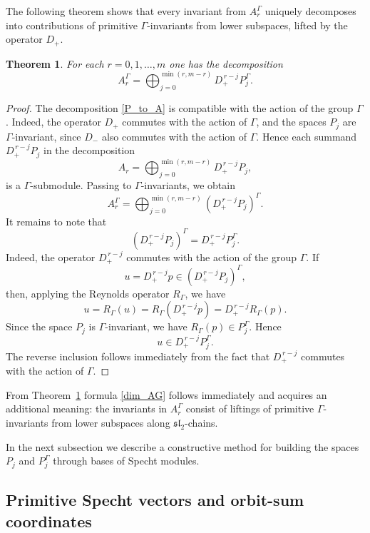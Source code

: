 \documentclass[12pt,reqno]{amsart}
\newtheorem{theorem}{Theorem}[section]
\begin{document}
The following theorem shows that every invariant from $A_r^\Gamma$ uniquely
decomposes into contributions of primitive $\Gamma$-invariants from lower
subspaces, lifted by the operator $D_+$.

\begin{theorem}\label{ AkGamma_primitive_decomposition}
For each $r=0,1,\dots,m$ one has the decomposition
$$
A_r^\Gamma
=
\bigoplus_{j=0}^{\min(r,m-r)}
D_+^{\,r-j}P_j^\Gamma.
$$
\end{theorem}

\begin{proof}
The decomposition \eqref{P_to_A} is compatible with the action of the group
$\Gamma$. Indeed, the operator $D_+$ commutes with the action of $\Gamma$,
and the spaces $P_j$ are $\Gamma$-invariant, since $D_-$ also commutes with
the action of $\Gamma$. Hence each summand $D_+^{\,r-j}P_j$ in the
decomposition
$$
A_r
=
\bigoplus_{j=0}^{\min(r,m-r)}
D_+^{\,r-j}P_j,
$$
is a $\Gamma$-submodule.
Passing to $\Gamma$-invariants, we obtain
$$
A_r^\Gamma
=
\bigoplus_{j=0}^{\min(r,m-r)}
\left(D_+^{\,r-j}P_j\right)^\Gamma.
$$
It remains to note that
$$
\left(D_+^{\,r-j}P_j\right)^\Gamma
=
D_+^{\,r-j}P_j^\Gamma.
$$
Indeed, the operator $D_+^{\,r-j}$ commutes with the action of the group
$\Gamma$.
If
$$
u=D_+^{\,r-j}p\in \left(D_+^{\,r-j}P_j\right)^\Gamma,
$$
then, applying the Reynolds operator $R_\Gamma$, we have
$$
u
=
R_\Gamma(u)
=
R_\Gamma(D_+^{\,r-j}p)
=
D_+^{\,r-j}R_\Gamma(p).
$$
Since the space $P_j$ is $\Gamma$-invariant, we have
$R_\Gamma(p)\in P_j^\Gamma$. Hence
$$
u\in D_+^{\,r-j}P_j^\Gamma.
$$
The reverse inclusion follows immediately from the fact that $D_+^{\,r-j}$
commutes with the action of $\Gamma$.
\end{proof}

From Theorem~\ref{ AkGamma_primitive_decomposition} formula
\eqref{dim_AG} follows immediately and acquires an additional meaning:
the invariants in $A_r^\Gamma$ consist of liftings of primitive
$\Gamma$-invariants from lower subspaces along $\mathfrak{sl}_2$-chains.

In the next subsection we describe a constructive method for building the
spaces $P_j$ and $P_j^\Gamma$ through bases of Specht modules.

\subsection{Primitive Specht vectors and orbit-sum coordinates}
\end{document}
